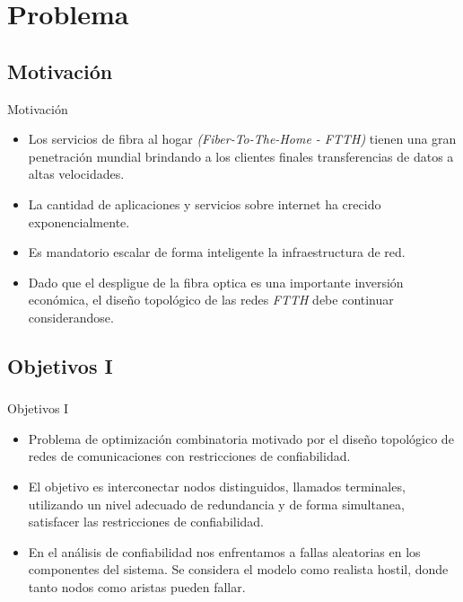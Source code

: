 \section{Problema}
\subsection{Motivación}
\begin{frame}%
    \begin{block}{Motivación}
    \begin{itemize} 
    	\item Los servicios de fibra al hogar \emph{(Fiber-To-The-Home - FTTH)} tienen una gran penetración mundial brindando a los clientes finales transferencias de datos a altas velocidades.
    	\item La cantidad de aplicaciones y servicios sobre internet ha crecido exponencialmente.
    	\item Es mandatorio escalar de forma inteligente la infraestructura de red.
    	\item Dado que el despligue de la fibra optica es una importante inversión económica, el diseño topológico de las redes \emph{FTTH} debe continuar considerandose.
	\end{itemize} 
    \end{block}
\end{frame}

\subsection{Objetivos I}
\begin{frame}
	\frametitle{}
    \begin{block}{Objetivos I}
	\begin{itemize} 
    	\item Problema de optimización combinatoria motivado por el diseño topológico de redes de comunicaciones 
con restricciones de confiabilidad.
		\item El objetivo es interconectar nodos distinguidos, llamados terminales, utilizando un nivel adecuado de redundancia y de forma simultanea, satisfacer las restricciones de confiabilidad.
	\item En el análisis de confiabilidad nos enfrentamos a fallas aleatorias en los componentes del sistema. Se considera el modelo como realista hostil, donde tanto nodos como aristas pueden fallar.
	\end{itemize} 
    \end{block}
\end{frame}

